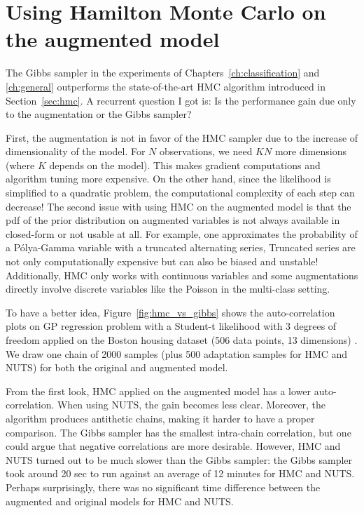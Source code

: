 \section{Using Hamilton Monte Carlo on the augmented model}

The Gibbs sampler in the experiments of Chapters~\ref{ch:classification} and \ref{ch:general} outperforms the state-of-the-art \ac{HMC} algorithm introduced in Section~\ref{sec:hmc}.
A recurrent question I got is:
Is the performance gain due only to the augmentation or the Gibbs sampler?

First, the augmentation is not in favor of the \ac{HMC} sampler due to the increase of dimensionality of the model.
For $N$ observations, we need $KN$ more dimensions (where $K$ depends on the model).
This makes gradient computations and algorithm tuning more expensive.
On the other hand, since the likelihood is simplified to a quadratic problem, the computational complexity of each step can decrease!
The second issue with using \ac{HMC} on the augmented model is that the \ac{pdf} of the prior distribution on augmented variables is not always available in closed-form or not usable at all.
For example, one approximates the probability of a P\'olya-Gamma variable with a truncated alternating series,
Truncated series are not only computationally expensive but can also be biased and unstable! 
Additionally, \ac{HMC} only works with continuous variables and some augmentations directly involve discrete variables like the Poisson in the multi-class setting.

To have a better idea, Figure~\ref{fig:hmc_vs_gibbs} shows the auto-correlation plots on \ac{GP} regression problem with a Student-t likelihood with 3 degrees of freedom applied on the Boston housing dataset (506 data points, 13 dimensions) \cite{harrison1978hedonic}.
We draw one chain of 2000 samples (plus 500 adaptation samples for \ac{HMC} and \ac{NUTS}) for both the original and augmented model.

From the first look, \ac{HMC} applied on the augmented model has a lower auto-correlation.
When using \ac{NUTS}, the gain becomes less clear.
Moreover, the algorithm produces antithetic chains, making it harder to have a proper comparison.
The Gibbs sampler has the smallest intra-chain correlation, but one could argue that negative correlations are more desirable.
However, \ac{HMC} and \ac{NUTS} turned out to be much slower than the Gibbs sampler:
the Gibbs sampler took around 20 sec to run against an average of 12 minutes for \ac{HMC} and \ac{NUTS}.
Perhaps surprisingly, there was no significant time difference between the augmented and original models for \ac{HMC} and \ac{NUTS}.

